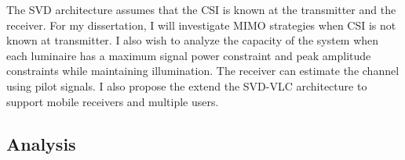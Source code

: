%

The SVD architecture assumes that the CSI is known at the transmitter and the receiver. For my dissertation, I will investigate MIMO strategies when CSI is not known at transmitter. I also wish to analyze the capacity of the system when each luminaire has a maximum signal power constraint and peak amplitude constraints while maintaining illumination. The receiver can estimate the channel using pilot signals. I also propose the extend the SVD-VLC architecture to support mobile receivers and multiple users.

\subsection{Analysis}
\label{sec:analysis}

